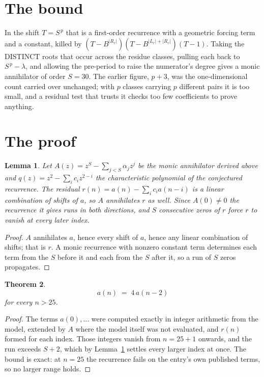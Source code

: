 \documentclass[11pt,a4paper]{article}
\theoremstyle{plain}
\newtheorem{theorem}{Theorem}
\newtheorem{lemma}[theorem]{Lemma}
\theoremstyle{definition}
\begin{document}
\section{The bound}

In the shift $T=S^{\,p}$ that is a first-order recurrence with a geometric forcing term and a
constant, killed by $(T-B^{|R_r|})(T-B^{|L_r|+|R_r|})(T-1)$. Taking the DISTINCT roots that
occur across the residue classes, pulling each back to $S^{\,p}-\lambda$, and allowing the
pre-period to raise the numerator's degree gives a monic annihilator of order $S=30$. The
earlier figure, $p+3$, was the one-dimensional count carried over unchanged; with $p$ classes
carrying $p$ different pairs it is too small, and a residual test that trusts it checks too few
coefficients to prove anything.

\section{The proof}

\begin{lemma}\label{lem:crit}
Let $A(z)=z^S-\sum_{j<S}\alpha_jz^{j}$ be the monic annihilator derived above and
$q(z)=z^{2}-\sum_ic_iz^{2-i}$ the characteristic polynomial of the conjectured
recurrence. The residual $r(n)=a(n)-\sum_ic_ia(n-i)$ is a linear combination of shifts of $a$,
so $A$ annihilates $r$ as well. Since $A(0)\ne0$ the recurrence it gives runs in both
directions, and $S$ consecutive zeros of $r$ force $r$ to vanish at every later index.
\end{lemma}

\begin{proof}
$A$ annihilates $a$, hence every shift of $a$, hence any linear combination of shifts; that is
$r$. A monic recurrence with nonzero constant term determines each term from the $S$ before it
and each from the $S$ after it, so a run of $S$ zeros propagates.
\end{proof}

\begin{theorem}
\[
a(n)\;=\;4\,a(n-2)
\]
for every $n>25$.
\end{theorem}

\begin{proof}
The terms $a(0),\dots$ were computed exactly in integer arithmetic from the model, extended by
$A$ where the model itself was not evaluated, and $r(n)$ formed for each index. Those integers
vanish from $n=25+1$ onwards, and the run exceeds $S+2$, which by
Lemma~\ref{lem:crit} settles every larger index at once. The bound is exact: at $n=25$ the recurrence fails on the entry's own published terms, so no larger range holds.
\end{proof}
\end{document}
